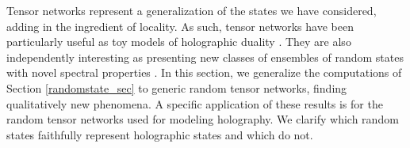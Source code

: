 \documentclass[a4paper,11pt]{article}
\newcommand*{\JKF}[1]{\textcolor{blue}{[JKF: #1]}}
\newcommand*{\SR}[1]{\textcolor{magenta}{[SR: \textsf{#1}]}}
\begin{document}
Tensor networks represent a generalization of the states we have considered, adding in the ingredient of locality. As such, tensor networks have been particularly useful as toy models of holographic duality \cite{2015JHEP...06..149P,2016JHEP...11..009H}. They are also independently interesting as presenting new classes of ensembles of random states with novel spectral properties \cite{2010JPhA...43A5303C}. In this section, we generalize the computations of Section \ref{randomstate_sec} to generic random tensor networks, finding qualitatively new phenomena. A specific application of these results is for the random tensor networks used for modeling holography. We clarify which random states faithfully represent holographic states and which do not.

\end{document}
